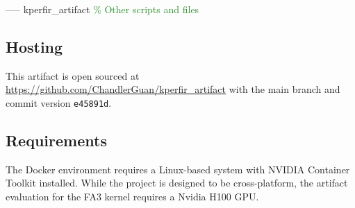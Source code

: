 \quad{}----- kperfir\_artifact    \hspace{1.2em} \textcolor{ForestGreen}{\% Other scripts and files}





\subsection*{Hosting}


This artifact is open sourced at \url{https://github.com/ChandlerGuan/kperfir_artifact} with the main branch and commit version \texttt{e45891d}.


\subsection*{Requirements}


The Docker environment requires a Linux-based system with NVIDIA Container Toolkit installed.
While the \thiswork{} project is designed to be cross-platform, the artifact evaluation for the FA3 kernel requires a Nvidia H100 GPU.


